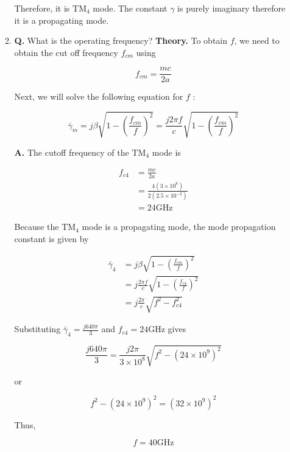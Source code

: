 \documentclass[main.tex]{subfiles}
\begin{document}
\begin{enumerate}
\begin{enumerate}
        Therefore, it is $\mathrm{TM_4}$ mode. The constant $\gamma$ is purely imaginary therefore it is a propagating mode.
        
        \item \textbf{Q.} What is the operating frequency? \textbf{Theory.} To obtain $f$, we need to obtain the cut off frequency $f_{c m}$ using
        
        $$
        f_{cm}=\frac{mc}{2 a}
        $$
        
        Next, we will solve the following equation for $f$ :
        
        $$
        \bar{\gamma}_m=j \beta \sqrt{1-\left(\frac{f_{c m}}{f}\right)^2}=\frac{j 2 \pi f}{c} \sqrt{1-\left(\frac{f_{c m}}{f}\right)^2}
        $$
        
        \textbf{A.} The cutoff frequency of the $\mathrm{TM}_4$ mode is
        
        $$
        \begin{aligned}
        f_{c4} & =\frac{m c}{2 a} \\
        & =\frac{4\left(3 \times 10^8\right)}{2\left(2.5 \times 10^{-2}\right)} \\
        & =24 \mathrm{GHz}
        \end{aligned}
        $$

        Because the $\mathrm{TM}_4$ mode is a propagating mode, the mode propagation constant is given by
        
        $$
        \begin{aligned}
        \bar{\gamma}_4 & =j \beta \sqrt{1-\left(\frac{f_{c m}}{f}\right)^2} \\
        & =j \frac{2 \pi f}{c} \sqrt{1-\left(\frac{f_{c 4}}{f}\right)^2} \\
        & =j \frac{2 \pi}{c} \sqrt{f^2-f_{c 4}^2}
        \end{aligned}
        $$

        Substituting $\bar{\gamma}_4=\frac{j 640 \pi}{3}$ and $f_{c 4}=24 \mathrm{GHz}$ gives
        
        $$
        \frac{j 640 \pi}{3}=\frac{j 2 \pi}{3 \times 10^8} \sqrt{f^2-\left(24 \times 10^9\right)^2}
        $$
        
        or
        
        $$
        f^2-\left(24 \times 10^9\right)^2=\left(32 \times 10^9\right)^2
        $$
        
        Thus,
        
        $$
        f=40 \mathrm{GHz}
        $$
        

\end{enumerate}
\end{enumerate}
\end{document}
